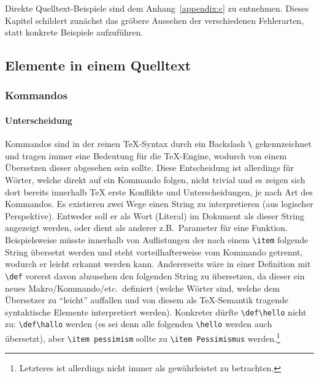 Direkte Quelltext-Beispiele sind dem Anhang~\ref{appendix:c} zu entnehmen. Dieses Kapitel schildert zunächst das gröbere Aussehen der verschiedenen Fehlerarten, statt konkrete Beispiele aufzuführen.







\subsection{Elemente in einem Quelltext}
\subsubsection{Kommandos}
\paragraph{Unterscheidung}
Kommandos sind in der reinen \TeX{}-Syntax durch ein Backslash \verb|\| gekennzeichnet und tragen immer eine Bedeutung für die \TeX{}-Engine, wodurch von einem Übersetzen dieser abgesehen sein sollte. 
Diese Entscheidung ist allerdings für Wörter, welche direkt auf ein Kommando folgen, nicht trivial und es zeigen sich dort bereits innerhalb \TeX{} erste Konflikte und Unterscheidungen, je nach Art des Kommandos.
Es existieren zwei Wege einen String zu interpretieren (aus logischer Perspektive). Entweder soll er als Wort (Literal) im Dokument als dieser String angezeigt werden, oder dient als anderer z.B.\ Parameter für eine Funktion.%
Beispielsweise müsste innerhalb von Auflistungen der nach einem \verb|\item| folgende String übersetzt werden und steht vorteilhafterweise vom Kommando getrennt, wodurch er leicht erkannt werden kann. Andererseits wäre in einer Definition mit \verb|\def| vorerst davon abzusehen den folgenden String zu übersetzen, da dieser ein neues Makro/Kommando/etc.\ definiert (welche Wörter sind, welche dem Übersetzer zu \enquote{leicht} auffallen und von diesem als \TeX{}-Semantik tragende syntaktische Elemente interpretiert werden). 
Konkreter dürfte \verb|\def\hello| nicht zu: \verb|\def\hallo| werden (es sei denn alle folgenden \verb|\hello| werden auch übersetzt), aber \verb|\item pessimism| sollte zu \verb|\item Pessimismus| werden.\footnote{Letzteres ist allerdings nicht immer als gewährleistet zu betrachten.}%


